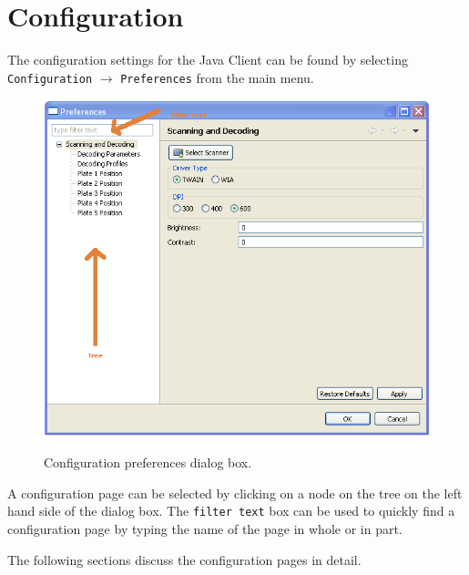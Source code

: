 \chapter{Configuration}
\label{chap:configuration}
The configuration settings for the Java Client can be found by selecting
\texttt{Configuration} $\to$ \texttt{Preferences} from the main menu.
    \begin{figure}[H]
      \centering
      \scalebox{0.5}
      { \includegraphics*{screenshots/configuration/preferences_dialog} }
      \caption{Configuration preferences dialog box.}
      \label{fig:preferences_dialog}
    \end{figure}
A configuration page can be selected by clicking on a node on the
tree on the left hand side of the dialog box. The \texttt{filter text} box can
be used to quickly find a configuration page by typing the name of the page in
whole or in part.

The following sections discuss the configuration pages in detail.

